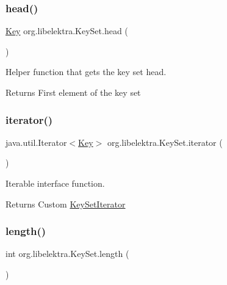 \subsubsection{\texorpdfstring{head()}{head()}}
{\footnotesize\ttfamily \hyperlink{classorg_1_1libelektra_1_1Key}{Key} org.\+libelektra.\+Key\+Set.\+head (\begin{DoxyParamCaption}{ }\end{DoxyParamCaption})\hspace{0.3cm}{\ttfamily [inline]}}



Helper function that gets the key set head. 

\begin{DoxyReturn}{Returns}
First element of the key set 
\end{DoxyReturn}
\mbox{\label{classorg_1_1libelektra_1_1KeySet_ac7ef2aa30918b5790cbba04b4fe70073}} 
\subsubsection{\texorpdfstring{iterator()}{iterator()}}
{\footnotesize\ttfamily java.\+util.\+Iterator$<$\hyperlink{classorg_1_1libelektra_1_1Key}{Key}$>$ org.\+libelektra.\+Key\+Set.\+iterator (\begin{DoxyParamCaption}{ }\end{DoxyParamCaption})\hspace{0.3cm}{\ttfamily [inline]}}



Iterable interface function. 

\begin{DoxyReturn}{Returns}
Custom \hyperlink{classorg_1_1libelektra_1_1KeySetIterator}{Key\+Set\+Iterator} 
\end{DoxyReturn}
\mbox{\label{classorg_1_1libelektra_1_1KeySet_aac3920fa38179de07bcd242207915540}} 
\subsubsection{\texorpdfstring{length()}{length()}}
{\footnotesize\ttfamily int org.\+libelektra.\+Key\+Set.\+length (\begin{DoxyParamCaption}{ }\end{DoxyParamCaption})\hspace{0.3cm}{\ttfamily [inline]}}




